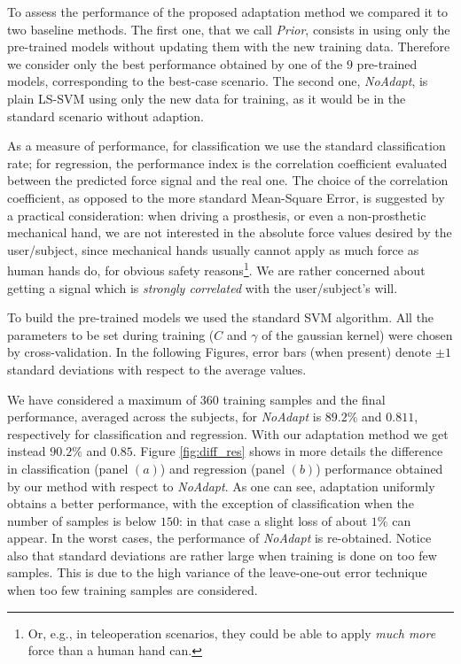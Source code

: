 To assess the performance of the proposed adaptation method we
compared it to two baseline methods. The first one, that we call
\emph{Prior}, consists in using only the pre-trained models without
updating them with the new training data. Therefore we consider only the
best performance obtained by one of the $9$ pre-trained models, corresponding to the
best-case scenario. The second one, \emph{NoAdapt}, is plain LS-SVM
using only the new data for training, as it would be in the standard
scenario without adaption.

As a measure of performance, for classification we use the standard
classification rate; for regression, the performance index is the
correlation coefficient evaluated between the predicted force signal
and the real one. The choice of the correlation coefficient, as
opposed to the more standard Mean-Square Error, is suggested by a
practical consideration: when driving a prosthesis, or even a
non-prosthetic mechanical hand, we are not interested in the absolute
force values desired by the user/subject, since mechanical hands
usually cannot apply as much force as human hands do, for obvious
safety reasons\footnote{Or, e.g., in teleoperation scenarios, they
could be able to apply \emph{much more} force than a human hand
can.}. We are rather concerned about getting a signal which is
\emph{strongly correlated} with the user/subject's will.

To build the pre-trained models we used the standard SVM
algorithm. All the parameters to be set during training ($C$ and
$\gamma$ of the gaussian kernel) were chosen by cross-validation. In
the following Figures, error bars (when present) denote $\pm 1$
standard deviations with respect to the average values.

We have considered a maximum of 360 training samples and the final performance,
averaged across the subjects, for \emph{NoAdapt} is $89.2\%$ and $0.811$,
respectively for classification and regression.
With our adaptation method we get instead $90.2\%$ and $0.85$.
Figure \ref{fig:diff_res} shows in more details the difference in classification
(panel $(a)$) and regression (panel $(b)$) performance obtained by our
method with respect to \emph{NoAdapt}. As one can see, adaptation
uniformly obtains a better performance, with the exception of
classification when the number of samples is below $150$: in that case a
slight loss of about $1\%$ can appear.  In the worst cases, the
performance of \emph{NoAdapt} is re-obtained. Notice also that
standard deviations are rather large when training is done on too few
samples. This is due to the high variance of the leave-one-out error
technique when too few training samples are considered.

